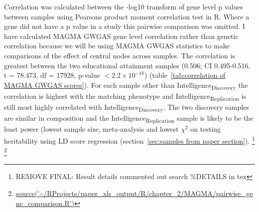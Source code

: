 Correlation was calculated between the -log10 transform of gene level p values between samples using Pearsons product moment correlation test in R. Where a gene did not have a p value in a study this pairwise comparison was omitted. I have calculated MAGMA GWGAS gene level correlation rather than genetic correlation because we will be using MAGMA GWGAS statistics to make comparisons of the effect of central nodes across samples. The correlation is greatest between the two educational attainment samples (0.506; CI 0.495-0.516, t = 78.473, df = 17928, p-value $< 2.2 \times 10^{-16}$) (table~\ref{tab:correlation of MAGMA GWGAS scores}). For each sample other than Intelligence\textsubscript{Discovery} the correlation is highest with the matching phenotype and Intelligence\textsubscript{Replication} is still most highly correlated with Intelligence\textsubscript{Discovery}. The two discovery samples are similar in composition and the Intelligence\textsubscript{Replication} sample is likely to be the least power (lowest sample size, meta-analysis and lowest $\chi^2$ on testing heritability using LD score regression (section~\ref{sec:samples from paper section}). 
\footnote{REMOVE FINAL: Result details commented out search \%DETAILS in tex} \footnote{\url{source('~/RProjects/paper_xls_output/R/chapter_2/MAGMA/pairwise_gene_comparison.R')}}










